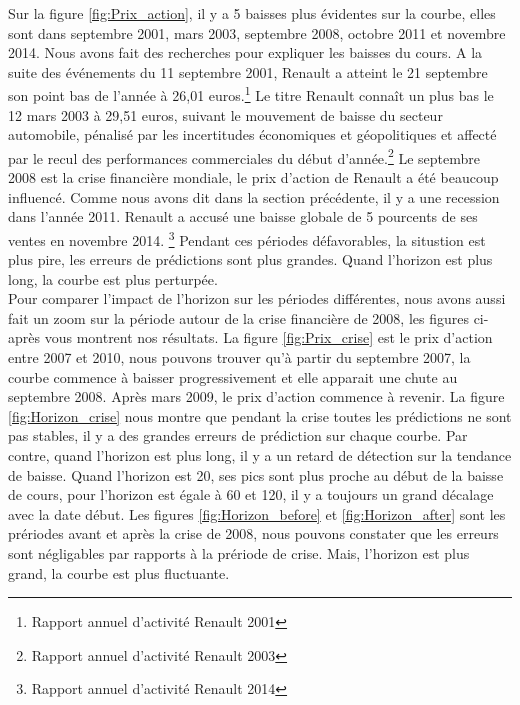 Sur la figure \ref{fig:Prix_action}, il y a 5 baisses plus évidentes sur la courbe, elles sont dans septembre 2001, mars 2003, septembre 2008, octobre 2011 et novembre 2014. Nous avons fait des recherches pour expliquer les baisses du cours. A la suite des événements du 11 septembre 2001, Renault a atteint le 21 septembre son point bas de l'année à 26,01 euros.\footnote{Rapport annuel d’activité
Renault 2001} Le titre Renault connaît un plus bas le 12 mars 2003 à 29,51 euros, suivant le mouvement de baisse du secteur automobile, pénalisé par les incertitudes économiques et géopolitiques et affecté par le recul des performances commerciales du début d’année.\footnote{Rapport annuel d’activité
Renault 2003} Le septembre 2008 est la crise financière mondiale, le prix d'action de Renault a été beaucoup influencé. Comme nous avons dit dans la section précédente, il y a une recession dans l'année 2011. Renault a accusé une baisse globale de 5 pourcents de ses ventes en novembre 2014. \footnote{Rapport annuel d’activité Renault 2014} Pendant ces périodes défavorables, la situstion est plus pire, les erreurs de prédictions sont plus grandes. Quand l'horizon est plus long, la courbe est plus perturpée. \\ 


Pour comparer l'impact de l'horizon sur les périodes différentes, nous avons aussi fait un zoom sur la période autour de la crise financière de 2008, les figures ci-après vous montrent nos résultats. La figure \ref{fig:Prix_crise} est le prix d'action entre 2007 et 2010, nous pouvons trouver qu'à partir du septembre 2007, la courbe commence à baisser progressivement et elle apparait une chute au septembre 2008. Après mars 2009, le prix d'action commence à revenir. La figure \ref{fig:Horizon_crise} nous montre que pendant la crise toutes les prédictions ne sont pas stables, il y a des grandes erreurs de prédiction sur chaque courbe. Par contre, quand l'horizon est plus long, il y a un retard de détection sur la tendance de baisse. Quand l'horizon est 20, ses pics sont plus proche au début de la baisse de cours, pour l'horizon est égale à 60 et 120, il y a toujours un grand décalage avec la date début. Les figures \ref{fig:Horizon_before} et \ref{fig:Horizon_after} sont les prériodes avant et après la crise de 2008, nous pouvons constater que les erreurs sont négligables par rapports à la prériode de crise. Mais, l'horizon est plus grand, la courbe est plus fluctuante.

